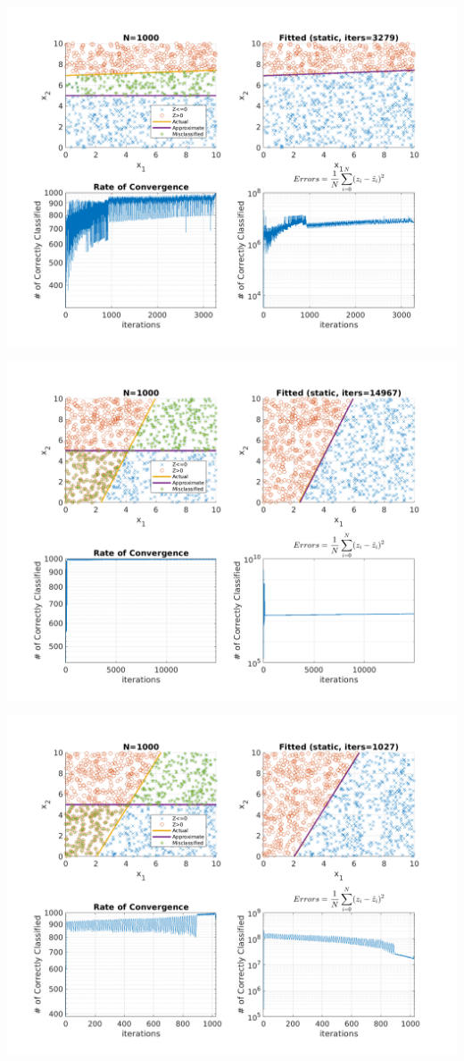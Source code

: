 \documentclass{article}
\newenvironment{Figure}
  {\par\medskip\noindent\minipage{\linewidth}}
  {\endminipage\par\medskip}
\begin{document}
\begin{multicols}{2}
\begin{Figure}
\centering
\includegraphics[width=\linewidth]{pngs/n1000_static1.png}
\end{Figure}
\begin{Figure}
\centering
\includegraphics[width=\linewidth]{pngs/n1000_static2.png}
\end{Figure}
\begin{Figure}
\centering
\includegraphics[width=\linewidth]{pngs/n1000_static3.png}

\end{Figure}
\end{multicols}
\end{document}

